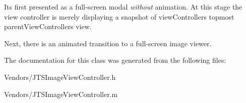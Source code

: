 It\textquotesingle{}s first presented as a full-\/screen modal {\itshape without} animation. At this stage the view controller is merely displaying a snapshot of view\+Controller\textquotesingle{}s topmost parent\+View\+Controller\textquotesingle{}s view.

Next, there is an animated transition to a full-\/screen image viewer. 

The documentation for this class was generated from the following files\+:\begin{DoxyCompactItemize}
\item 
Vendors/J\+T\+S\+Image\+View\+Controller.\+h\item 
Vendors/J\+T\+S\+Image\+View\+Controller.\+m\end{DoxyCompactItemize}
